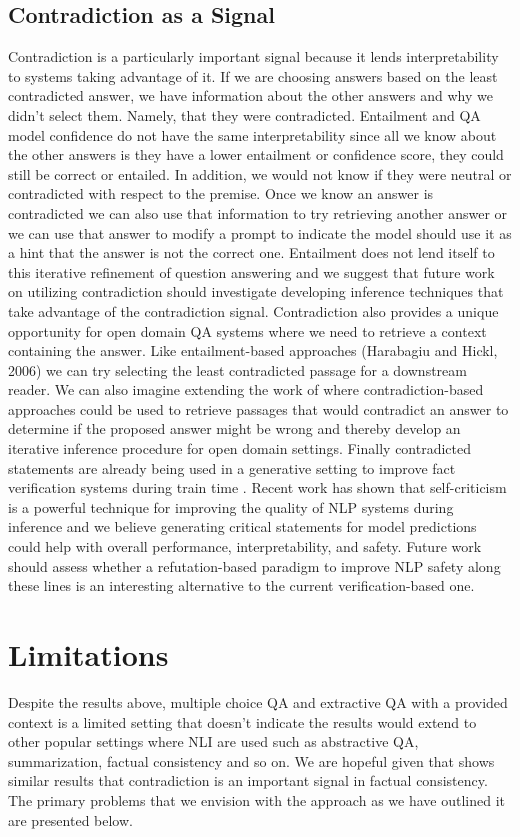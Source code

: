 \documentclass[11pt]{article}
\begin{document}
\subsection{Contradiction as a Signal}
Contradiction is a particularly important signal because it lends interpretability to systems taking advantage of it. If we are choosing answers based on the least contradicted answer, we have information about the other answers and why we didn’t select them. Namely, that they were contradicted. Entailment and QA model confidence do not have the same interpretability since all we know about the other answers is they have a lower entailment or confidence score, they could still be correct or entailed. In addition, we would not know if they were neutral or contradicted with respect to the premise.
Once we know an answer is contradicted we can also use that information to try retrieving another answer or we can use that answer to modify a prompt to indicate the model should use it as a hint that the answer is not the correct one. Entailment does not lend itself to this iterative refinement of question answering and we suggest that future work on utilizing contradiction should investigate developing inference techniques that take advantage of the contradiction signal.
Contradiction also provides a unique opportunity for open domain QA systems where we need to retrieve a context containing the answer. Like entailment-based approaches (Harabagiu and Hickl, 2006) we can try selecting the least contradicted passage for a downstream reader. We can also imagine extending the work of \citet{schuster_stretching_2022} where contradiction-based approaches could be used to retrieve passages that would contradict an answer to determine if the proposed answer might be wrong and thereby develop an iterative inference procedure for open domain settings.
Finally contradicted statements are already being used in a generative setting to improve fact verification systems during train time \citep{wright_generating_2022, pan_zero-shot_2021, saakyan_covid-fact_2021}. Recent work \citep{saunders_self-critiquing_2022} has shown that self-criticism is a powerful technique for improving the quality of NLP systems during inference and we believe generating critical statements for model predictions could help with overall performance, interpretability, and safety. Future work should assess whether a refutation-based paradigm to improve NLP safety along these lines is an interesting alternative to the current verification-based one.
\section{Limitations}
Despite the results above, multiple choice QA and extractive QA with a provided context is a limited setting that doesn’t indicate the results would extend to other popular settings where NLI are used such as abstractive QA, summarization, factual consistency and so on. We are hopeful given that \citet{laban_summac_2022} shows similar results that contradiction is an important signal in factual consistency. The primary problems that we envision with the approach as we have outlined it are presented below.
\end{document}
